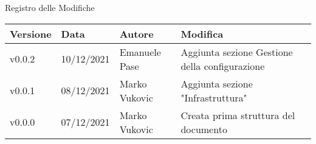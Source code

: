\begin{center}
  \huge{Registro delle Modifiche}
\end{center}

\begin{center}
  \begin{tabular}{|p{2cm}|p{2cm}|p{3cm}|p{5cm}|}
    \hline
    \textbf{Versione} & \textbf{Data} & \textbf{Autore} & \textbf{Modifica}                    \\ \hline
    v0.0.2            & 10/12/2021    & Emanuele Pase   & Aggiunta sezione Gestione della configurazione \\ \hline
    v0.0.1            & 08/12/2021    & Marko Vukovic   & Aggiunta sezione "Infrastruttura" \\ \hline
    v0.0.0            & 07/12/2021    & Marko Vukovic   & Creata prima struttura del documento \\ \hline
  \end{tabular}
\end{center}
